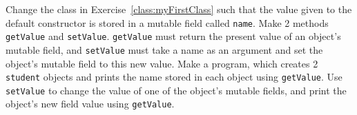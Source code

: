 Change the class in Exercise~\ref{class:myFirstClass} such that the value given to the default constructor is stored in a mutable field called \lstinline{name}. Make 2 methods \lstinline{getValue} and \lstinline{setValue}. \lstinline{getValue} must return the present value of an object's mutable field, and \lstinline{setValue} must take a name as an argument and set the object's mutable field to this new value. Make a program, which creates 2 \lstinline{student} objects and prints the name stored in each object using \lstinline{getValue}. Use \lstinline{setValue} to change the value of one of the object's mutable fields, and print the object's new field value using \lstinline{getValue}.